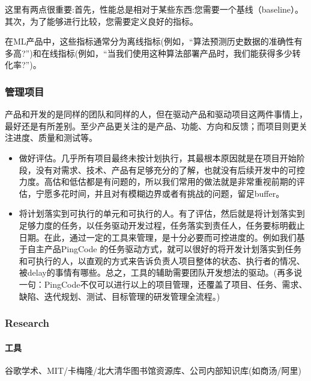 \documentclass[letterpaper,11pt,english]{sphinxmanual}
\begin{document}
这里有两点很重要:首先，性能总是相对于某些东西:您需要一个基线（baseline）。其次，为了能够进行比较，您需要定义良好的指标。

在ML产品中，这些指标通常分为离线指标(例如，“算法预测历史数据的准确性有多高?”)和在线指标(例如，“当我们使用这种算法部署产品时，我们能获得多少转化率?”)。


\subsubsection{管理项目}
\label{\detokenize{chapter_skill/project_manage:id1}}\label{\detokenize{chapter_skill/project_manage::doc}}
产品和开发的是同样的团队和同样的人，但在驱动产品和驱动项目这两件事情上，最好还是有所差别。至少产品更关注的是产品、功能、方向和反馈；而项目则更关注进度、质量和测试等。
\begin{itemize}
\item {} 
做好评估。几乎所有项目最终未按计划执行，其最根本原因就是在项目开始阶段，没有对需求、技术、产品有足够充分的了解，也就没有后续开发中的可控力度。高估和低估都是有问题的，所以我们常用的做法就是非常重视前期的评估，宁愿多花时间，并且对有模糊边界或者有挑战的问题，留足buffer。

\item {} 
将计划落实到可执行的单元和可执行的人。有了评估，然后就是将计划落实到足够力度的任务，以任务驱动开发过程，任务落实到责任人，任务要标明截止日期。在此，通过一定的工具来管理，是十分必要而可控进度的。例如我们基于自主产品PingCode
的任务驱动方式，就可以很好的将开发计划落实到任务和可执行的人，以直观的方式来告诉负责人项目整体的状态、执行者的情况、被delay的事情有哪些。总之，工具的辅助需要团队开发想法的驱动。(再多说一句：PingCode不仅可以进行以上的项目管理，还覆盖了项目、任务、需求、缺陷、迭代规划、测试、目标管理的研发管理全流程。)

\end{itemize}


\subsubsection{Research}
\label{\detokenize{chapter_skill/research:research}}\label{\detokenize{chapter_skill/research::doc}}

\paragraph{工具}
\label{\detokenize{chapter_skill/research:id1}}
谷歌学术、MIT/卡梅隆/北大清华图书馆资源库、公司内部知识库(如商汤/阿里)
\end{document}
